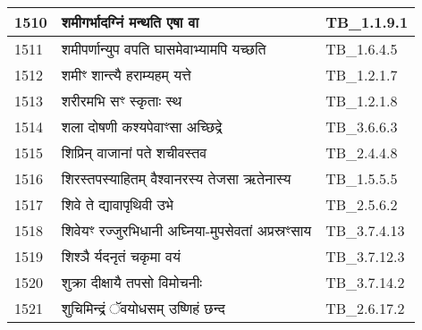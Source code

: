 \documentclass[17pt]{extarticle}
\begin{document}
\begin{longtable}{||p{0.4in}||p{4.9in}||p{0.9in}||}
    \hline
        
    1510 & शमीगर्भादग्निं मन्थति एषा वा & TB\_1.1.9.1       \\
    
    \hline
        
    1511 & शमीपर्णान्युप वपति घासमेवाभ्यामपि यच्छति & TB\_1.6.4.5       \\
    
    \hline
        
    1512 & शमीꣳ शान्त्यै हराम्यहम् यत्ते & TB\_1.2.1.7       \\
    
    \hline
        
    1513 & शरीरमभि सꣳ स्कृताः स्थ & TB\_1.2.1.8       \\
    
    \hline
        
    1514 & शला दोषणी कश्यपेवाꣳसा अच्छिद्रे & TB\_3.6.6.3       \\
    
    \hline
        
    1515 & शिप्रिन् वाजानां पते शचीवस्तव & TB\_2.4.4.8       \\
    
    \hline
        
    1516 & शिरस्तपस्याहितम् वैश्वानरस्य तेजसा ऋतेनास्य & TB\_1.5.5.5       \\
    
    \hline
        
    1517 & शिवे ते द्यावापृथिवी उभे & TB\_2.5.6.2       \\
    
    \hline
        
    1518 & शिवेयꣳ रज्जुरभिधानी अघ्निया{-}मुपसेवतां अप्रस्रꣳसाय & TB\_3.7.4.13       \\
    
    \hline
        
    1519 & शिश्ञै र्यदनृतं चकृमा वयं & TB\_3.7.12.3       \\
    
    \hline
        
    1520 & शुक्रा दीक्षायै तपसो विमोचनीः & TB\_3.7.14.2       \\
    
    \hline
        
    1521 & शुचिमिन्द्रं ॅवयोधसम् उष्णिहं छन्द & TB\_2.6.17.2       \\
    
    \hline
        

\end{longtable}
\end{document}
